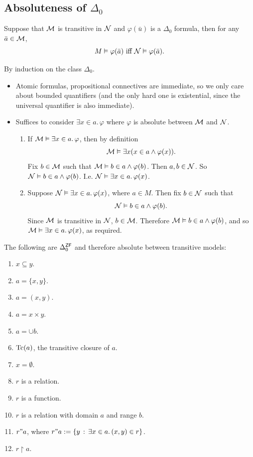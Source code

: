 \documentclass{article}
\begin{document}
\subsection{Absoluteness of $\Delta_{0}$}
\begin{fancythm}{}
    Suppose that $\mathcal{M}$ is transitive in $\mathcal{N}$ and $\varphi( \bar{u})$ is a $\Delta_{0}$ formula, then for any $\bar{a} \in \mathcal{M}$, \[ M \vDash \varphi(\bar{a}) \text{ iff } \mathcal{N} \vDash \varphi(\bar{a}).\]
\end{fancythm}
\proof By induction on the class $\Delta_{0}$. \begin{itemize}
    \item Atomic formulas, propositional connectives are immediate, so we only care about bounded quantifiers (and the only hard one is existential, since the universal quantifier is also immediate).
    \item Suffices to consider $\exists x \in a. \, \varphi$ where $\varphi$ is absolute between $\mathcal{M}$ and $\mathcal{N}$. \begin{enumerate}
              \item[$\Rightarrow$] If $\mathcal{M} \vDash \exists x \in a.\, \varphi$, then by definition \[ \mathcal{M} \vDash \exists x (x \in a \wedge \varphi(x)).\]
                    Fix $b \in \mathcal{M}$ such that $\mathcal{M} \vDash b \in a \wedge \varphi(b)$.  Then $a,b \in \mathcal{N}$. So $\mathcal{N} \vDash b \in a \wedge \varphi(b)$. I.e. $\mathcal{N} \vDash \exists x \in a. \, \varphi(x)$.
              \item[$\Leftarrow$] Suppose $\mathcal{N} \vDash \exists x \in a. \, \varphi(x)$, where $a \in M$. Then fix $b \in \mathcal{N}$ such that \[ \mathcal{N} \vDash b \in a \wedge \varphi(b).\]
                    Since $\mathcal{M}$ is transitive in $\mathcal{N}$, $b \in \mathcal{M}$. Therefore $\mathcal{M} \vDash b \in a \wedge \varphi(b)$, and so $\mathcal{M} \vDash \exists x \in a. \, \varphi(x)$, as required.
          \end{enumerate}
\end{itemize}
\endproof
\begin{fancyprop}{}
    The following are $\Delta_{0}^{\mathsf{ZF}}$ and therefore absolute between transitive models: \begin{enumerate}
        \item $x \subseteq y$.
        \item $a = \{x,y\}$.
        \item $a = (x,y)$.
        \item $a = x \times y$.
        \item $a = \cup b$.
        \item $\operatorname{Tc}(a)$, the transitive closure of $a$.
        \item $x = \emptyset$.
        \item $r$ is a relation.
        \item $r$ is a function.
        \item $r$ is a relation with domain $a$ and range $b$.
        \item $r"a$, where $r"a := \{ y \, : \, \exists x \in a.\, (x,y) \in r\}$.
        \item $r\upharpoonright a$.
    \end{enumerate}
\end{fancyprop}
\end{document}
